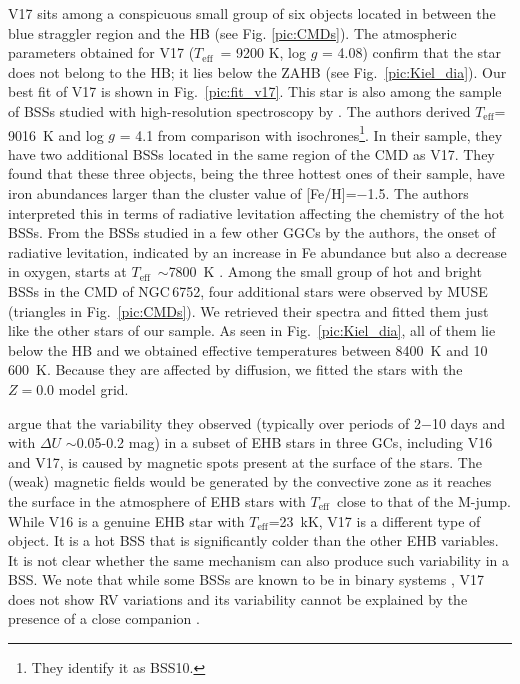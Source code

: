 \documentclass{aa}
\newcommand{\teff}{$T_{\text{eff}}$}
\newcommand{\teffs}{effective temperatures }
\begin{document}
V17 sits among a conspicuous small group of six objects located in between the blue straggler region and the HB (see Fig. \ref{pic:CMDs}). The atmospheric parameters obtained for V17 (\teff\ = 9200 K, log $g$ = 4.08) confirm that the star does not belong to the HB; it lies below the ZAHB (see Fig.~\ref{pic:Kiel_dia}). Our best fit of V17 is shown in Fig.~\ref{pic:fit_v17}.
This star is also among the sample of BSSs studied with high-resolution spectroscopy by \citet{lovisi2013}. The authors derived \teff = 9016~K and log $g$ = 4.1 from comparison with isochrones\footnote{They identify it as BSS10.}. In their sample, they have two additional BSSs located in the same region of the CMD as V17. They found that these three objects, being the three hottest ones of their sample, have iron abundances larger than the cluster value of [Fe/H]=$-$1.5. The authors interpreted this in terms of radiative levitation affecting the chemistry of the hot BSSs. From the BSSs studied in a few other GGCs by the authors, the onset of radiative levitation, indicated by an increase in Fe abundance but also a decrease in oxygen, starts at \teff\ $\sim$7800~K \citep{lovisi2013}. Among the small group of hot and bright BSSs in the CMD of NGC\,6752, four additional stars were observed by MUSE (triangles in  Fig.~\ref{pic:CMDs}). We retrieved their spectra and fitted them just like the other stars of our sample. As seen in Fig.~\ref{pic:Kiel_dia}, all of them lie below the HB and we obtained \teffs between 8400~K and 10\,600~K. Because they are affected by diffusion, we fitted the stars with the $Z=0.0$ model grid.

\citet{momany2020} argue that the variability they observed (typically over periods of 2$-$10 days and with $\Delta U$ $\sim$0.05-0.2 mag) in a subset of EHB stars in three GCs, including V16 and V17, is caused by magnetic spots present at the surface of the stars. The (weak) magnetic fields would be generated by the  convective zone as it reaches the surface in the atmosphere of EHB stars with \teff\ close to that of the M-jump. While V16 is a genuine EHB star with \teff=23~kK, V17 is a different type of object. It is a hot BSS that is significantly colder than the other EHB variables. It is not clear whether the same mechanism can also produce such variability in a BSS. We note that while some BSSs are known to be in binary systems \citep{giesers2019}, V17 does not show RV variations and its variability cannot be explained by the presence of a close companion \citep{momany2020}.
\end{document}
